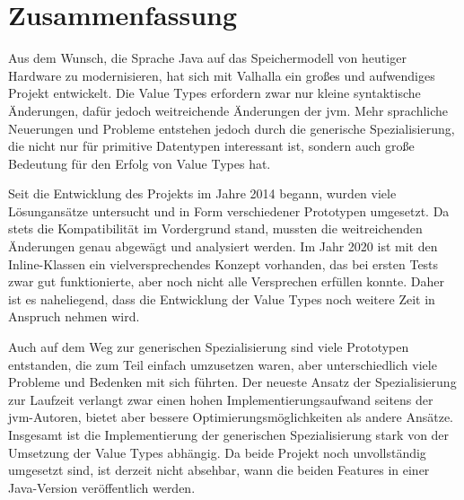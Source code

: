 \section{Zusammenfassung}\label{sec:summary}

Aus dem Wunsch, die Sprache Java auf das Speichermodell von heutiger Hardware zu modernisieren, hat sich mit Valhalla ein großes und aufwendiges Projekt entwickelt.
Die Value Types erfordern zwar nur kleine syntaktische Änderungen, dafür jedoch weitreichende Änderungen der \ac{jvm}.
Mehr sprachliche Neuerungen und Probleme entstehen jedoch durch die generische Spezialisierung, die nicht nur für primitive Datentypen interessant ist, sondern auch große Bedeutung für den Erfolg von Value Types hat.

Seit die Entwicklung des Projekts im Jahre 2014 begann, wurden viele Lösungansätze untersucht und in Form verschiedener Prototypen umgesetzt.
Da stets die Kompatibilität im Vordergrund stand, mussten die weitreichenden Änderungen genau abgewägt und analysiert werden.
Im Jahr 2020 ist mit den Inline-Klassen ein vielversprechendes Konzept vorhanden, das bei ersten Tests zwar gut funktionierte, aber noch nicht alle Versprechen erfüllen konnte.
Daher ist es naheliegend, dass die Entwicklung der Value Types noch weitere Zeit in Anspruch nehmen wird.

Auch auf dem Weg zur generischen Spezialisierung sind viele Prototypen entstanden, die zum Teil einfach umzusetzen waren, aber unterschiedlich viele Probleme und Bedenken mit sich führten.
Der neueste Ansatz der Spezialisierung zur Laufzeit verlangt zwar einen hohen Implementierungsaufwand seitens der \ac{jvm}-Autoren, bietet aber bessere Optimierungsmöglichkeiten als andere Ansätze.
Insgesamt ist die Implementierung der generischen Spezialisierung stark von der Umsetzung der Value Types abhängig.
Da beide Projekt noch unvollständig umgesetzt sind, ist derzeit nicht absehbar, wann die beiden Features in einer Java-Version veröffentlich werden.

